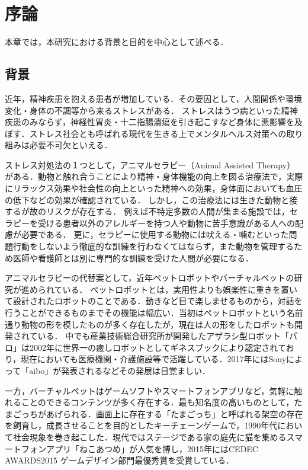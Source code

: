 ﻿\chapter{序論}
本章では，本研究における背景と目的を中心として述べる．

\section{背景}

近年，精神疾患を抱える患者が増加している．その要因として，人間関係や環境変化・身体の不調等から来るストレスがある．
ストレスはうつ病といった精神疾患のみならず，神経性胃炎・十二指腸潰瘍を引き起こすなど身体に悪影響を及ぼす．ストレス社会とも呼ばれる現代を生きる上でメンタルヘルス対策への取り組みは必要不可欠といえる．

ストレス対処法の１つとして，アニマルセラピー（Animal Assisted Therapy）がある．動物と触れ合うことにより精神・身体機能の向上を図る治療法で，実際にリラックス効果や社会性の向上といった精神への効果，身体面においても血圧の低下などの効果が確認されている．
しかし，この治療法には生きた動物と接するが故のリスクが存在する．
例えば不特定多数の人間が集まる施設では，セラピーを受ける患者以外のアレルギーを持つ人や動物に苦手意識がある人への配慮が必要である．
更に，セラピーに使用する動物には吠える・噛むといった問題行動をしないよう徹底的な訓練を行わなくてはならず，また動物を管理するため医師や看護師とは別に専門的な訓練を受けた人間が必要になる．

アニマルセラピーの代替案として，近年ペットロボットやバーチャルペットの研究が進められている．
ペットロボットとは，実用性よりも娯楽性に重きを置いて設計されたロボットのことである．動きなど目で楽しませるものから，対話を行うことができるものまでその機能は幅広い．当初はペットロボットという名前通り動物の形を模したものが多く存在したが，現在は人の形をしたロボットも開発されている．
中でも産業技術総合研究所が開発したアザラシ型ロボット「パロ」は2002年に世界一の癒しロボットとしてギネスブックにより認定されており，現在においても医療機関・介護施設等で活躍している．2017年にはSonyによって「aibo」が発表されるなどその発展は目覚ましい．

一方，バーチャルペットはゲームソフトやスマートフォンアプリなど，気軽に触れることのできるコンテンツが多く存在する．最も知名度の高いものとして，たまごっちがあげられる．画面上に存在する「たまごっち」と呼ばれる架空の存在を飼育し，成長させることを目的としたキーチェーンゲームで，1990年代において社会現象を巻き起こした．現代ではステージである家の庭先に猫を集めるスマートフォンアプリ「ねこあつめ」が人気を博し，2015年にはCEDEC AWARDS2015 ゲームデザイン部門最優秀賞を受賞している．

